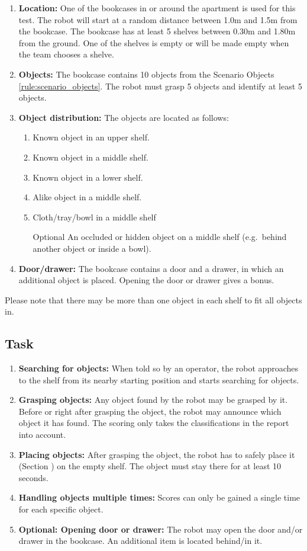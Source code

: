 \begin{enumerate}
\item \textbf{Location:} One of the bookcases in or around the apartment is used for this test. The robot will start at a random distance between 1.0m and 1.5m from the bookcase.
The bookcase has at least 5 shelves between 0.30m and 1.80m from the ground. One of the shelves is empty or will be made empty when the team chooses a shelve.
\item \textbf{Objects:} The bookcase contains 10 objects from the Scenario Objects \ref{rule:scenario_objects}.
  The robot must grasp 5 objects and identify at least 5 objects. 
\item \textbf{Object distribution:} The objects are located as follows:
\begin{enumerate}
\item Known object in an upper shelf.
\item Known object in a middle shelf.
\item Known object in a lower shelf.
\item Alike object in a middle shelf.
\item Cloth/tray/bowl in a middle shelf
\item[Optional] An occluded or hidden object on a middle shelf (e.g.~behind another object or inside a bowl).
\end{enumerate}
\item \textbf{Door/drawer:} The bookcase contains a door and a drawer, in which an additional object is placed. Opening the door or drawer gives a bonus. 
\end{enumerate}

Please note that there may be more than one object in each shelf to fit all objects in.

\subsection{Task}
\begin{enumerate}
\item \textbf{Searching for objects:} When told so by an operator, the robot approaches to the shelf from its nearby starting position and starts searching for objects.
\item \textbf{Grasping objects:} Any object found by the robot may be grasped by it. Before or right after grasping the object, the robot may announce which object it has found. The scoring only takes the classifications in the report into account. 
\item \textbf{Placing objects:} After grasping the object, the robot has to safely place it (Section ) on the empty shelf. 
  The object must stay there for at least 10 seconds.
\item \textbf{Handling objects multiple times:} Scores can only be gained a single time for each specific object.
\item \textbf{Optional: Opening door or drawer:} The robot may open the door and/or drawer in the bookcase. An additional item is located behind/in it. 
\end{enumerate}

